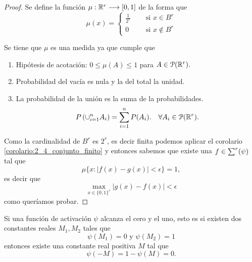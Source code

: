 \begin{proof}
    Se define la función $\mu : \mathbb{R}^r \longrightarrow [0,1]$ de la forma que 
    \begin{equation}
        \mu(x) = 
      \left \{
    \begin{aligned}
      \frac{1}{2^r} \quad &\text{ si } x \in B^r \\
      0 \quad & \text{ si } x \notin B^r 
    \end{aligned}
  \right .
    \end{equation}

    Se tiene que $\mu$ es una medida ya que cumple que 
    \begin{enumerate}
        \item Hipótesis de acotación: $0 \leq \mu(A) \leq 1$ para $A \in \mathcal{P}(\mathbb{R}^r).$
        \item Probabilidad del vacía es nula y la del  total la unidad. 
        \item La probabilidad de la unión es la suma de la probabilidades. 
        \begin{equation}
            P\left(
                \cup_{i=1}^n A_i
            \right)
            = \sum_{i=1}^n P(A_i).
            \quad
            \forall A_i \in  \mathcal{P}(\mathbb{R}^r).
        \end{equation}
    \end{enumerate}  

    Como la cardinalidad de $B^r$ es $2^r$, es decir finita
    podemos aplicar el corolario \ref{corolario:2_4_conjunto_finito}
    y entonces sabemos que  existe una $f\in \sum^r (\psi)$ tal que 
    \begin{equation}
            \mu\{ 
                x:
                |f(x) - g(x)| 
                < \epsilon
            \}
            = 1,
    \end{equation} 
    es decir que 
    \begin{equation}
        \max_{x \in \{ 0,1\}^r} |g(x) - f(x)|
        < \epsilon
    \end{equation}
    como queríamos probar. 
\end{proof}
\begin{lema} \label{lema:propio_1_antes_teorema_2_5}
    Si una función de activación  $\psi$ alcanza el cero y el uno, esto es 
    si existen dos constantes reales $M_1, M_2$ 
    tales que 
    \begin{equation}
        \psi(M_1) = 0 \text{ y } \psi(M_2)=1
    \end{equation}
    entonces existe una constante real positiva $M$ tal que 
    \begin{equation}
        \psi(-M) = 1- \psi(M) = 0.
    \end{equation}
\end{lema}
